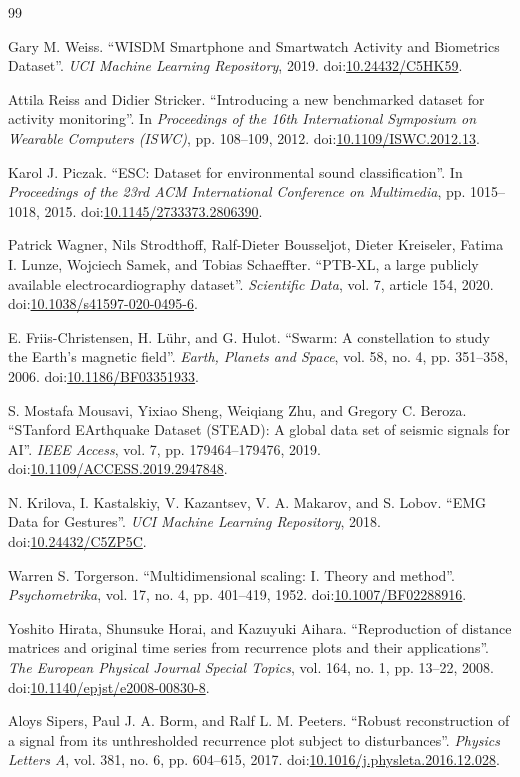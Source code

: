 \documentclass[preprint,12pt]{elsarticle}
\begin{document}
{\small
\begin{thebibliography}{99}
\setlength{\itemsep}{0pt}
\raggedright

Gary M. Weiss. ``WISDM Smartphone and Smartwatch Activity and Biometrics Dataset''. \textit{UCI Machine Learning Repository}, 2019. doi:\url{10.24432/C5HK59}.

Attila Reiss and Didier Stricker. ``Introducing a new benchmarked dataset for activity monitoring''. In \textit{Proceedings of the 16th International Symposium on Wearable Computers (ISWC)}, pp. 108--109, 2012. doi:\url{10.1109/ISWC.2012.13}.

Karol J. Piczak. ``ESC: Dataset for environmental sound classification''. In \textit{Proceedings of the 23rd ACM International Conference on Multimedia}, pp. 1015--1018, 2015. doi:\url{10.1145/2733373.2806390}.

Patrick Wagner, Nils Strodthoff, Ralf-Dieter Bousseljot, Dieter Kreiseler, Fatima I. Lunze, Wojciech Samek, and Tobias Schaeffter. ``PTB-XL, a large publicly available electrocardiography dataset''. \textit{Scientific Data}, vol. 7, article 154, 2020. doi:\url{10.1038/s41597-020-0495-6}.

E. Friis-Christensen, H. Lühr, and G. Hulot. ``Swarm: A constellation to study the Earth's magnetic field''. \textit{Earth, Planets and Space}, vol. 58, no. 4, pp. 351--358, 2006. doi:\url{10.1186/BF03351933}.

S. Mostafa Mousavi, Yixiao Sheng, Weiqiang Zhu, and Gregory C. Beroza. ``STanford EArthquake Dataset (STEAD): A global data set of seismic signals for AI''. \textit{IEEE Access}, vol. 7, pp. 179464--179476, 2019. doi:\url{10.1109/ACCESS.2019.2947848}.

N. Krilova, I. Kastalskiy, V. Kazantsev, V. A. Makarov, and S. Lobov. ``EMG Data for Gestures''. \textit{UCI Machine Learning Repository}, 2018. doi:\url{10.24432/C5ZP5C}.

Warren S. Torgerson. ``Multidimensional scaling: I. Theory and method''. \textit{Psychometrika}, vol. 17, no. 4, pp. 401--419, 1952. doi:\url{10.1007/BF02288916}.

Yoshito Hirata, Shunsuke Horai, and Kazuyuki Aihara. ``Reproduction of distance matrices and original time series from recurrence plots and their applications''. \textit{The European Physical Journal Special Topics}, vol. 164, no. 1, pp. 13--22, 2008. doi:\url{10.1140/epjst/e2008-00830-8}.

Aloys Sipers, Paul J. A. Borm, and Ralf L. M. Peeters. ``Robust reconstruction of a signal from its unthresholded recurrence plot subject to disturbances''. \textit{Physics Letters A}, vol. 381, no. 6, pp. 604--615, 2017. doi:\url{10.1016/j.physleta.2016.12.028}.
\end{thebibliography}
}
\end{document}
